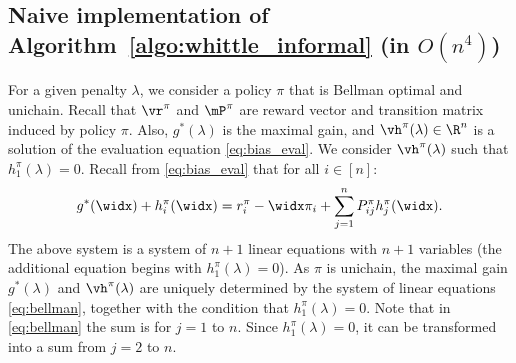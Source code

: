 \subsection[Naive implementation of Algorithm~\ref{algo:whittle_informal} \texorpdfstring{(in $O(S^4)$)}{}]{Naive implementation of Algorithm~\ref{algo:whittle_informal} \texorpdfstring{(in $O(n^4)$)}{}}
\label{ssec:implem}

For a given penalty $\lambda$, we consider a policy $\pi$ that is Bellman optimal and unichain.
Recall that $\vr^\pi$ and $\mP^\pi$ are reward vector and transition matrix induced by policy $\pi$.
Also, $g^{*}(\lambda)$ is the maximal gain, and $\vh^{\pi}(\lambda)\in\R^n$ is a solution of the evaluation equation \eqref{eq:bias_eval}.
We consider $\vh^{\pi}(\lambda)$ such that $h^\pi_1(\lambda)=0$.
Recall from \eqref{eq:bias_eval} that for all $i\in[n]:$
\begin{align}
    \label{eq:bellman}
    g^*(\widx) + h^{\pi}_i(\widx) = r_i^{\pi} -\widx\pi_i + \sum_{j=1}^nP^{\pi}_{ij}h^{\pi}_j(\widx).
\end{align}
The above system is a system of $n+1$ linear equations with $n+1$ variables (the additional equation begins with $h_1^\pi(\lambda)=0$).
As $\pi$ is unichain, the maximal gain $g^*(\lambda)$ and $\vh^\pi(\lambda)$ are uniquely determined by the system of linear equations \eqref{eq:bellman}, together with the condition that $h_1^\pi(\lambda)=0$.
Note that in \eqref{eq:bellman} the sum is for $j=1$ to $n$.
Since $h_1^\pi(\lambda)=0$, it can be transformed into a sum from $j=2$ to $n$. 

